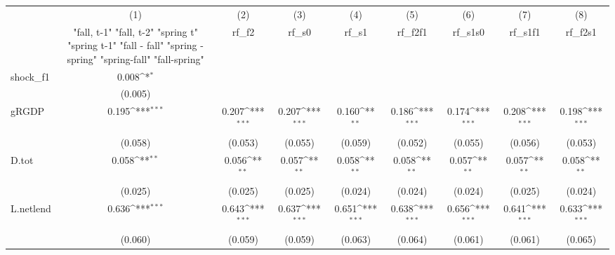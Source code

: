 {
\def\sym#1{\ifmmode^{#1}\else\(^{#1}\)\fi}
\begin{tabular}{l*{8}{c}}
\toprule
            &\multicolumn{1}{c}{(1)}&\multicolumn{1}{c}{(2)}&\multicolumn{1}{c}{(3)}&\multicolumn{1}{c}{(4)}&\multicolumn{1}{c}{(5)}&\multicolumn{1}{c}{(6)}&\multicolumn{1}{c}{(7)}&\multicolumn{1}{c}{(8)}\\
            &\multicolumn{1}{c}{  "fall, t-1" "fall, t-2" "spring t" "spring t-1"  "fall - fall" "spring - spring" "spring-fall" "fall-spring" }&\multicolumn{1}{c}{rf\_f2}&\multicolumn{1}{c}{rf\_s0}&\multicolumn{1}{c}{rf\_s1}&\multicolumn{1}{c}{rf\_f2f1}&\multicolumn{1}{c}{rf\_s1s0}&\multicolumn{1}{c}{rf\_s1f1}&\multicolumn{1}{c}{rf\_f2s1}\\
\midrule
shock\_f1    &       0.008\sym{*}  &                     &                     &                     &                     &                     &                     &                     \\
            &     (0.005)         &                     &                     &                     &                     &                     &                     &                     \\
\addlinespace
gRGDP       &       0.195\sym{***}&       0.207\sym{***}&       0.207\sym{***}&       0.160\sym{**} &       0.186\sym{***}&       0.174\sym{***}&       0.208\sym{***}&       0.198\sym{***}\\
            &     (0.058)         &     (0.053)         &     (0.055)         &     (0.059)         &     (0.052)         &     (0.055)         &     (0.056)         &     (0.053)         \\
\addlinespace
D.tot       &       0.058\sym{**} &       0.056\sym{**} &       0.057\sym{**} &       0.058\sym{**} &       0.058\sym{**} &       0.057\sym{**} &       0.057\sym{**} &       0.058\sym{**} \\
            &     (0.025)         &     (0.025)         &     (0.025)         &     (0.024)         &     (0.024)         &     (0.024)         &     (0.025)         &     (0.024)         \\
\addlinespace
L.netlend   &       0.636\sym{***}&       0.643\sym{***}&       0.637\sym{***}&       0.651\sym{***}&       0.638\sym{***}&       0.656\sym{***}&       0.641\sym{***}&       0.633\sym{***}\\
            &     (0.060)         &     (0.059)         &     (0.059)         &     (0.063)         &     (0.064)         &     (0.061)         &     (0.061)         &     (0.065)         \\

\end{tabular}}
